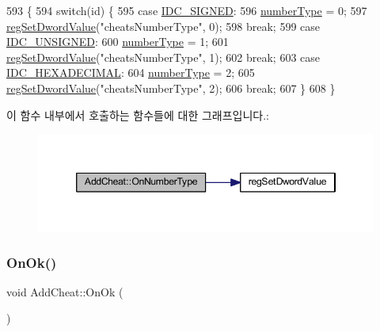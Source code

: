 \begin{DoxyCode}
593 \{
594   \textcolor{keywordflow}{switch}(\textcolor{keywordtype}{id}) \{
595   \textcolor{keywordflow}{case} \mbox{\hyperlink{resource_8h_ae13e01a62e7c40be0e3a93d98d2cd1d3}{IDC\_SIGNED}}:
596     \mbox{\hyperlink{class_add_cheat_a50115e7ad42a106db574754cc81bc9a0}{numberType}} = 0;
597     \mbox{\hyperlink{_reg_8cpp_a758e775489a3fb5c3cc7071fdd5af87e}{regSetDwordValue}}(\textcolor{stringliteral}{"cheatsNumberType"}, 0);
598     \textcolor{keywordflow}{break};
599   \textcolor{keywordflow}{case} \mbox{\hyperlink{resource_8h_aeedbb412500d742d9253c77868e55102}{IDC\_UNSIGNED}}:
600     \mbox{\hyperlink{class_add_cheat_a50115e7ad42a106db574754cc81bc9a0}{numberType}} = 1;
601     \mbox{\hyperlink{_reg_8cpp_a758e775489a3fb5c3cc7071fdd5af87e}{regSetDwordValue}}(\textcolor{stringliteral}{"cheatsNumberType"}, 1);
602     \textcolor{keywordflow}{break};
603   \textcolor{keywordflow}{case} \mbox{\hyperlink{resource_8h_a41e2d269f242a0163051e37d88a2ee61}{IDC\_HEXADECIMAL}}:
604     \mbox{\hyperlink{class_add_cheat_a50115e7ad42a106db574754cc81bc9a0}{numberType}} = 2;
605     \mbox{\hyperlink{_reg_8cpp_a758e775489a3fb5c3cc7071fdd5af87e}{regSetDwordValue}}(\textcolor{stringliteral}{"cheatsNumberType"}, 2);
606     \textcolor{keywordflow}{break};
607   \}
608 \}
\end{DoxyCode}
이 함수 내부에서 호출하는 함수들에 대한 그래프입니다.\+:
\nopagebreak
\begin{figure}[H]
\begin{center}
\leavevmode
\includegraphics[width=346pt]{class_add_cheat_a3ac4c44d5f9ec5037e92034789c276b4_cgraph}
\end{center}
\end{figure}
\mbox{\label{class_add_cheat_ad3785b90d963668a87ff33fb93cf56d9}} 
\subsubsection{\texorpdfstring{On\+Ok()}{OnOk()}}
{\footnotesize\ttfamily void Add\+Cheat\+::\+On\+Ok (\begin{DoxyParamCaption}{ }\end{DoxyParamCaption})\hspace{0.3cm}{\ttfamily [protected]}}



